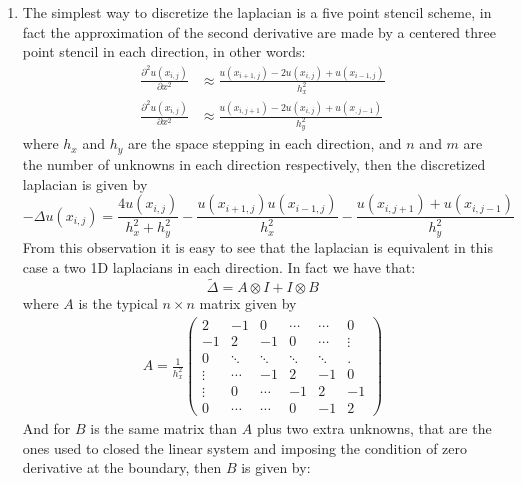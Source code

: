 \documentclass{article}
\numberwithin{equation}{section}
\begin{document}
    \section{}
    \begin{enumerate}[label=(\alph*)]
        \item The simplest way to discretize the laplacian is a five point stencil scheme, in fact the approximation of the second derivative are made by a centered three point stencil in each direction, in other words:
        \begin{align*}
            \frac{\partial^2 u(x_{i,j})}{\partial x^2}
            & \approx \frac{u(x_{i+1,j})-2u(x_{i,j})+u(x_{i-1,j})}{h_{x}^2}\\
            \frac{\partial^2 u(x_{i,j})}{\partial x^2}
            & \approx \frac{u(x_{i,j+1})-2u(x_{i,j})+u(x_{,j-1})}{h_y^2}
        \end{align*}
        where $h_x$ and $h_y$ are the space stepping in each direction, and $n$ and $m$ are the number of unknowns in each direction respectively, then the discretized laplacian is given by
            $$-\Delta u(x_{i,j}) = \frac{4u(x_{i,j})}{h_x^2+h_y^2} - \frac{u(x_{i+1,j})u(x_{i-1,j})}{h_x^2} - \frac{u(x_{i,j+1})+u(x_{i,j-1})}{h_y^2}$$
        From this observation it is easy to see that the laplacian is equivalent in this case a two 1D laplacians in each direction. In fact we have that:
            $$\tilde{\Delta} = A \otimes I + I \otimes B$$
        where $A$ is the typical $n \times n$ matrix given by
        \begin{align*}
            A = \frac{1}{h_x^2}\begin{pmatrix}
                2 & -1 & 0 & \cdots & \cdots & 0\\
                -1 & 2 & -1 & 0 & \cdots & \vdots\\
                0 & \ddots & \ddots & \ddots & \ddots & .\\
                \vdots & \cdots & -1 & 2 & -1 & 0\\
                \vdots & 0 & \cdots & -1 & 2 & -1 \\
                0 & \cdots & \cdots & 0 & -1 & 2
            \end{pmatrix}
        \end{align*}
        And for $B$ is the same matrix than $A$ plus two extra unknowns, that are the ones used to closed the linear system and imposing the condition of zero derivative at the boundary, then $B$ is given by:
        \begin{align*}

\end{align*}
\end{enumerate}
\end{document}

